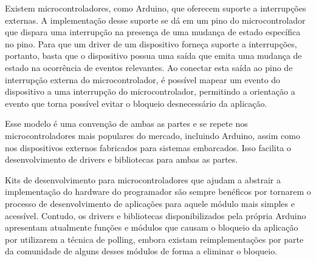 \documentclass[11pt]{article}
\begin{document}
\par Existem microcontroladores, como Arduino, que oferecem suporte a interrupções externas. A implementação desse suporte se dá em um pino do microcontrolador que dispara uma interrupção na presença de uma mudança de estado específica no pino. Para que um driver de um dispositivo forneça suporte a interrupções, portanto, basta que o dispositivo possua uma saída que emita uma mudança de estado na ocorrência de eventos relevantes. Ao conectar esta saída ao pino de interrupção externa do microcontrolador, é possível mapear um evento do dispositivo a uma interrupção do microcontrolador, permitindo a orientação a evento que torna possível evitar o bloqueio desnecessário da aplicação.
\par Esse modelo é uma convenção de ambas as partes e se repete nos microcontroladores mais populares do mercado, incluindo Arduino, assim como nos dispositivos externos fabricados para sistemas embarcados. Isso facilita o desenvolvimento de drivers e bibliotecas para ambas as partes.
\par Kits de desenvolvimento para microcontroladores que ajudam a abstrair a implementação do hardware do programador são sempre benéficos por tornarem o processo de desenvolvimento de aplicações para aquele módulo mais simples e acessível. Contudo, os drivers e bibliotecas disponibilizados pela própria Arduino apresentam atualmente funções e módulos que causam o bloqueio da aplicação por utilizarem a técnica de polling, embora existam reimplementações por parte da comunidade de alguns desses módulos de forma a eliminar o bloqueio.
\end{document}
